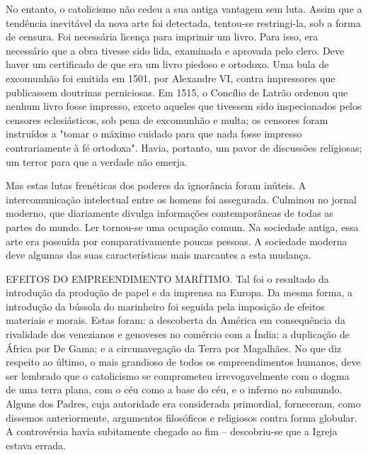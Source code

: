 \documentclass[11pt,a5paper,twoside,openany]{book}
\begin{document}
No entanto, o catolicismo não cedeu a sua antiga vantagem sem luta. Assim que a tendência inevitável da nova arte foi detectada, tentou-se restringi-la, sob a forma de censura. Foi necessária licença para imprimir um livro. Para isso, era necessário que a obra tivesse sido lida, examinada e aprovada pelo clero. Deve haver um certificado de que era um livro piedoso e ortodoxo. Uma bula de excomunhão foi emitida em 1501, por Alexandre VI, contra impressores que publicassem doutrinas perniciosas. Em 1515, o Concílio de Latrão ordenou que nenhum livro fosse impresso, exceto aqueles que tivessem sido inspecionados pelos censores eclesiásticos, sob pena de excomunhão e multa; os censores foram instruídos a "tomar o máximo cuidado para que nada fosse impresso contrariamente à fé ortodoxa". Havia, portanto, um pavor de discussões religiosas; um terror para que a verdade não emerja.

Mas estas lutas frenéticas dos poderes da ignorância foram inúteis. A intercomunicação intelectual entre os homens foi assegurada. Culminou no jornal moderno, que diariamente divulga informações contemporâneas de todas as partes do mundo. Ler tornou-se uma ocupação comum. Na sociedade antiga, essa arte era possuída por comparativamente poucas pessoas. A sociedade moderna deve algumas das suas características mais marcantes a esta mudança.

EFEITOS DO EMPREENDIMENTO MARÍTIMO. Tal foi o resultado da introdução da produção de papel e da imprensa na Europa. Da mesma forma, a introdução da bússola do marinheiro foi seguida pela imposição de efeitos materiais e morais. Estas foram: a descoberta da América em consequência da rivalidade dos venezianos e genoveses no comércio com a Índia; a duplicação de África por De Gama; e a circunavegação da Terra por Magalhães. No que diz respeito ao último, o mais grandioso de todos os empreendimentos humanos, deve ser lembrado que o catolicismo se comprometeu irrevogavelmente com o dogma de uma terra plana, com o céu como a base do céu, e o inferno no submundo. Alguns dos Padres, cuja autoridade era considerada primordial, forneceram, como dissemos anteriormente, argumentos filosóficos e religiosos contra forma globular. A controvérsia havia subitamente chegado ao fim – descobriu-se que a Igreja estava errada.
\end{document}

